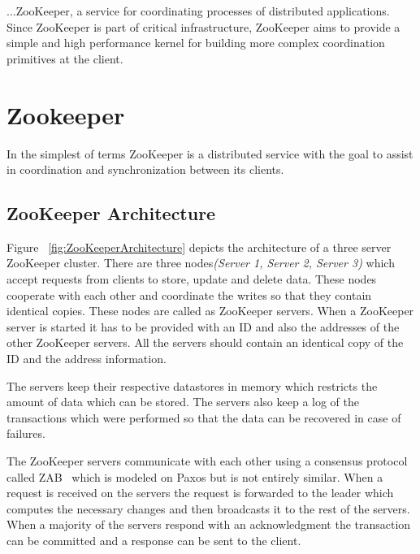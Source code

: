 \begin{savequote}[100mm]
...ZooKeeper, a service for coordinating processes of distributed applications. Since ZooKeeper is part of critical infrastructure, ZooKeeper aims to provide a simple and high performance kernel for building more complex coordination primitives at the client.
\end{savequote}

\chapter{Zookeeper}
In the simplest of terms ZooKeeper is a distributed service with the goal to assist in coordination and synchronization between its clients.

\section{ZooKeeper Architecture}

Figure ~\ref{fig:ZooKeeperArchitecture} depicts the architecture of a three server ZooKeeper cluster. There are three nodes\textit{(Server 1, Server 2, Server 3)} which accept requests from clients to store, update and delete data. These nodes cooperate with each other and coordinate the writes so that they contain identical copies. These nodes are called as ZooKeeper servers. When a ZooKeeper server is started it has to be provided with an ID and also the addresses of the other ZooKeeper servers. All the servers should contain an identical copy of the ID and the address information.

The servers keep their respective datastores in memory which restricts the amount of data which can be stored. The servers also keep a log of the transactions which were performed so that the data can be recovered in case of failures.

\addvspace{2.5em}

\addvspace{1.0em}

The ZooKeeper servers communicate with each other using a consensus protocol called ZAB~\cite{junqueira2011zab} which is modeled on Paxos but is not entirely similar. When a request is received on the servers the request is forwarded to the leader which computes the necessary changes and then broadcasts it to the rest of the servers. When a majority of the servers respond with an acknowledgment the transaction can be committed and a response can be sent to the client. 

